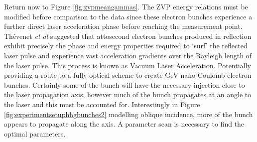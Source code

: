 Return now to Figure \ref{fig:zvpmeangammas}. The ZVP energy relations must be modified before comparison to the data since these electron bunches experience a further direct laser acceleration phase before reaching the measurement point. Thévenet \textit{et al} \cite{thevenetVacuumLaserAcceleration2016} suggested that attosecond electron bunches produced in reflection exhibit precisely the phase and energy properties required to `surf' the reflected laser pulse and experience vast acceleration gradients over the Rayleigh length of the laser pulse. This process is known as Vacuum Laser Acceleration. Potentially providing a route to a fully optical scheme to create GeV nano-Coulomb electron bunches. Certainly some of the bunch will have the necessary injection close to the laser propagation axis, however much of the bunch propagates at an angle to the laser and this must be accounted for. Interestingly in Figure \ref{fig:experimentsetuphhgbunches2} modelling oblique incidence, more of the bunch appears to propagate along the axis. A parameter scan is necessary to find the optimal parameters.

